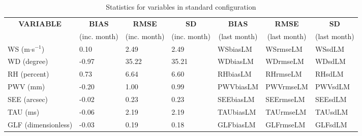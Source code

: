 \documentclass[11pt,english]{article}
\begin{document}
\clearpage
\begin{table}[]
\begin{center}
\begin{tabular}{|l|l|l|l|l|l|l|}
\hline
\multicolumn{1}{|c|}{\cellcolor[HTML]{C0C0C0}\textbf{VARIABLE}} & \multicolumn{1}{c|}{\cellcolor[HTML]{C0C0C0}\textbf{BIAS}} & \multicolumn{1}{c|}{\cellcolor[HTML]{C0C0C0}\textbf{RMSE}} & \multicolumn{1}{c|}{\cellcolor[HTML]{C0C0C0}\textbf{SD}} & \multicolumn{1}{c|}{\cellcolor[HTML]{C0C0C0}\textbf{BIAS}} & \multicolumn{1}{c|}{\cellcolor[HTML]{C0C0C0}\textbf{RMSE}} & \multicolumn{1}{c|}{\cellcolor[HTML]{C0C0C0}\textbf{SD}}\\
\multicolumn{1}{|c|}{\cellcolor[HTML]{C0C0C0}} & \multicolumn{1}{c|}{\cellcolor[HTML]{C0C0C0}(inc. month)} & \multicolumn{1}{c|}{\cellcolor[HTML]{C0C0C0}(inc. month)} & \multicolumn{1}{c|}{\cellcolor[HTML]{C0C0C0}(inc. month)} & \multicolumn{1}{c|}{\cellcolor[HTML]{C0C0C0}(last month)} & \multicolumn{1}{c|}{\cellcolor[HTML]{C0C0C0}(last month)} & \multicolumn{1}{c|}{\cellcolor[HTML]{C0C0C0}(last month)}\\\hline
\cellcolor[HTML]{C0C0C0}WS (m$\cdot$s$^{-1}$) &      0.10  &      2.49  &      2.49  & WSbiasLM     & WSrmseLM     & WSsdLM\\
\cellcolor[HTML]{C0C0C0}WD (degree)           &     -0.97  &     35.22  &     35.21  & WDbiasLM     & WDrmseLM     & WDsdLM\\
\cellcolor[HTML]{C0C0C0}RH (percent)          &      0.73  &      6.64  &      6.60  & RHbiasLM     & RHrmseLM     & RHsdLM\\
\cellcolor[HTML]{C0C0C0}PWV (mm)              &     -0.20 &      1.00 &      0.99 & PWVbiasLM    & PWVrmseLM    & PWVsdLM\\
\cellcolor[HTML]{C0C0C0}SEE (arcsec)          &     -0.02 &      0.23 &      0.23 & SEEbiasLM    & SEErmseLM    & SEEsdLM\\
\cellcolor[HTML]{C0C0C0}TAU (ms)              &     -0.06 &      2.19 &      2.19 & TAUbiasLM    & TAUrmseLM    & TAUsdLM\\
\cellcolor[HTML]{C0C0C0}GLF (dimensionless)   &     -0.03 &      0.19 &      0.18 & GLFbiasLM    & GLFrmseLM    & GLFsdLM\\
\hline
\end{tabular}
\caption{Statistics for variables in standard configuration}
\end{center}
\end{table}
\end{document}
